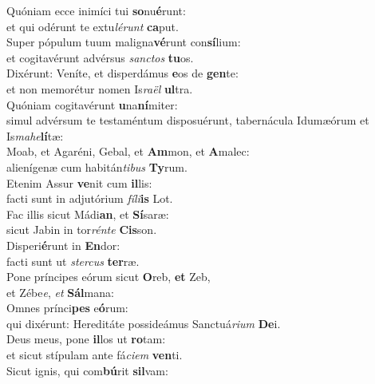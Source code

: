 \evenverse Quóniam ecce inimíci tui \textbf{so}nu\textbf{é}runt:~\*\\
\evenverse et qui odérunt te extu\textit{lé}\textit{runt} \textbf{ca}put.\\
\oddverse Super pópulum tuum maligna\textbf{vé}runt con\textbf{sí}lium:~\*\\
\oddverse et cogitavérunt advérsus \textit{san}\textit{ctos} \textbf{tu}os.\\
\evenverse Dixérunt: Veníte, et disperdámus \textbf{e}os de \textbf{gen}te:~\*\\
\evenverse et non memorétur nomen Is\textit{ra}\textit{ël} \textbf{ul}tra.\\
\oddverse Quóniam cogitavérunt \textbf{u}na\textbf{ní}miter:~\*\\
\oddverse simul advérsum te testaméntum disposuérunt, tabernácula Idumæórum et Is\textit{ma}\textit{he}\textbf{lí}tæ:\\
\evenverse Moab, et Agaréni, Gebal, et \textbf{Am}mon, et \textbf{A}malec:~\*\\
\evenverse alienígenæ cum habitán\textit{ti}\textit{bus} \textbf{Ty}rum.\\
\oddverse Etenim Assur \textbf{ve}nit cum \textbf{il}lis:~\*\\
\oddverse facti sunt in adjutórium \textit{fí}\textit{li}\textbf{is} Lot.\\
\evenverse Fac illis sicut Mádi\textbf{an}, et \textbf{Sí}saræ:~\*\\
\evenverse sicut Jabin in tor\textit{rén}\textit{te} \textbf{Cis}son.\\
\oddverse Disperi\textbf{é}runt in \textbf{En}dor:~\*\\
\oddverse facti sunt ut \textit{ster}\textit{cus} \textbf{ter}ræ.\\
\evenverse Pone príncipes eórum sicut \textbf{O}reb, \textbf{et} Zeb,~\*\\
\evenverse et Zébe\textit{e}, \textit{et} \textbf{Sál}mana:\\
\oddverse Omnes prínci\textbf{pes} e\textbf{ó}rum:~\*\\
\oddverse qui dixérunt: Hereditáte possideámus Sanctuá\textit{ri}\textit{um} \textbf{De}i.\\
\evenverse Deus meus, pone \textbf{il}los ut \textbf{ro}tam:~\*\\
\evenverse et sicut stípulam ante fá\textit{ci}\textit{em} \textbf{ven}ti.\\
\oddverse Sicut ignis, qui com\textbf{bú}rit \textbf{sil}vam:~\*\\
